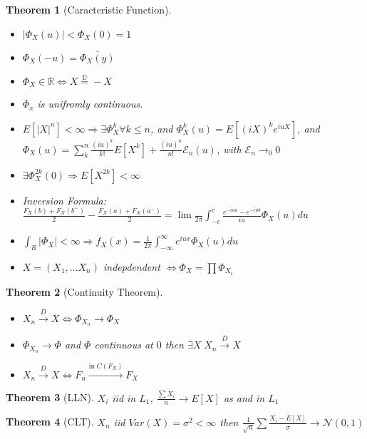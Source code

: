 \documentclass{article}
\newtheorem{theorem}{Theorem}
\begin{document}
\begin{theorem}[Caracteristic Function]
  \begin{itemize}
  \item $|\Phi_X(u)| < \Phi_X(0) = 1$
  \item $\Phi_X(-u) = \bar {\Phi_X(y)}$
  \item $\Phi_X \in \mathbb R \iff X \overset{\mathbb D}{=} -X$
  \item $\Phi_x$ is unifromly continuous.
  \item $E[|X|^n] < \infty \Rightarrow \exists \Phi^{k}_X \forall k \le n$, and $\Phi_X^k(u) = E[(iX)^ke^{iuX}]$, and $\Phi_X(u) = \sum_k^n \frac{(iu)^k}{k!}E[X^k] + \frac{(iu)^n}{n!}\mathcal E_n(u)$, with $\mathcal E_n \rightarrow_0 0$
  \item $\exists \Phi^{2k}_X(0) \Rightarrow E[X^{2k}] < \infty$
  \item Inversion Formula: $\frac{F_X(b) + F_X(b^-)}{2}- \frac{F_X(a) + F_X(a^-)}{2} = \lim \frac{}{2\pi} \int_{-c}^{c} \frac{e^{-iua} - e^{-iub}}{iu}\Phi_X(u) du$
  \item $\int_R |\Phi_X| < \infty \Rightarrow f_X(x) = \frac{1}{2\pi} \int_{-\infty}^{\infty} e^{iux} \Phi_X(u) du$
  \item $X = (X_1, \ldots X_n)$ indepdendent $\iff \Phi_X = \prod \Phi_{X_i}$
  \end{itemize}
\end{theorem}
\begin{theorem}[Continuity Theorem]
  \begin{itemize}
  \item $X_n \overset{D}{\rightarrow} X \iff \Phi_{X_n} \rightarrow \Phi_X$
  \item $\Phi_{X_n} \rightarrow \Phi$ and $\Phi$ continuous at $0$ then $\exists X \; X_n \overset{D}{\rightarrow} X$
  \item $X_n \overset{D}{\rightarrow} X \iff F_n \overset{\text{in} \; C(F_X)}\rightarrow F_X$
  \end{itemize}
\end{theorem}
\begin{theorem}[LLN]
  $X_i$ iid in $L_1$, $\frac{\sum X_i}{n} \rightarrow E[X]$ as and in $L_1$
\end{theorem}
\begin{theorem}[CLT]
  $X_n$ iid $Var(X) = \sigma^2 < \infty$ then $\frac{1}{\sqrt n}\sum \frac{X_i - E[X]}{\sigma} \rightarrow \mathcal N(0, 1)$
\end{theorem}
\end{document}

